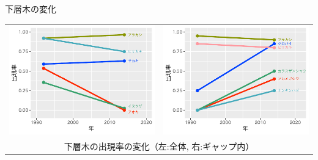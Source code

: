 \documentclass[unicode]{beamer}
\begin{document}
\begin{frame}
\begin{columns}[t]
\begin{column}{.49\linewidth}
\begin{block}{下層木の変化}
\centering
\begin{tabular}{cc}
\includegraphics{prop_presense.pdf} &
\includegraphics{prop_gap.pdf} \\
\multicolumn{2}{c}{\small 下層木の出現率の変化（左:全体, 右:ギャップ内）}
\end{tabular}
\end{block}


\end{column}
\end{columns}
\end{frame}
\end{document}
